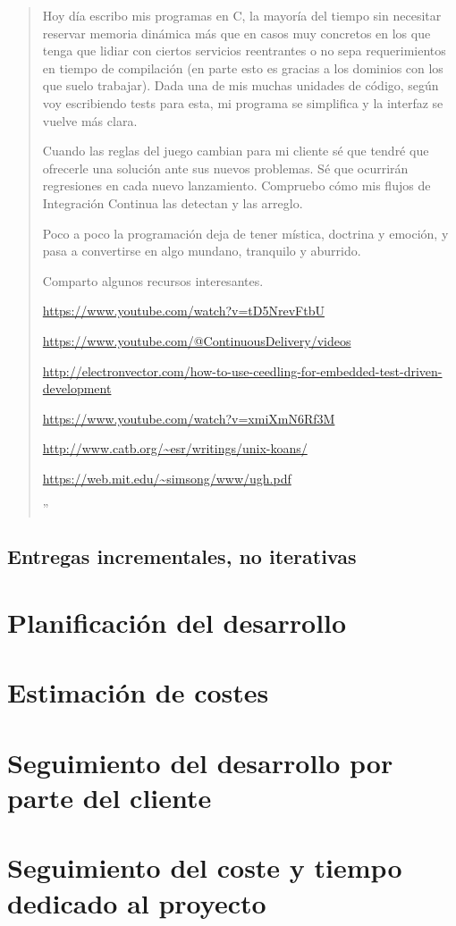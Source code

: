 \begin{quote}
{    Hoy día escribo mis programas en C, la mayoría del tiempo sin necesitar reservar
    memoria dinámica más que en casos muy concretos en los que tenga que lidiar con
    ciertos servicios reentrantes o no sepa requerimientos en tiempo de compilación
    (en parte esto es gracias a los dominios con los que suelo trabajar). Dada una
    de mis muchas unidades de código, según voy escribiendo tests para esta, mi
    programa se simplifica y la interfaz se vuelve más clara.

    Cuando las reglas del juego cambian para mi cliente sé que tendré que ofrecerle
    una solución ante sus nuevos problemas. Sé que ocurrirán regresiones en cada nuevo
    lanzamiento. Compruebo cómo mis flujos de Integración Continua las detectan y las arreglo.

    Poco a poco la programación deja de tener mística, doctrina y emoción, y pasa a
    convertirse en algo mundano, tranquilo y aburrido.

    Comparto algunos recursos interesantes.

    \url{https://www.youtube.com/watch?v=tD5NrevFtbU}

    \url{https://www.youtube.com/@ContinuousDelivery/videos}

    \url{http://electronvector.com/how-to-use-ceedling-for-embedded-test-driven-development}

    \url{https://www.youtube.com/watch?v=xmiXmN6Rf3M}

    \url{http://www.catb.org/~esr/writings/unix-koans/}

    \url{https://web.mit.edu/~simsong/www/ugh.pdf}%
}''
\end{quote}


\subsection{Entregas incrementales, no iterativas}

\section{Planificación del desarrollo}


\section{Estimación de costes}


\section{Seguimiento del desarrollo por parte del cliente}


\section{Seguimiento del coste y tiempo dedicado al proyecto}



